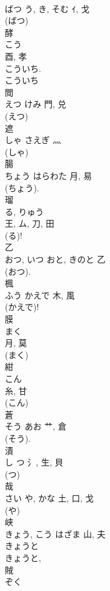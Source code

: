 \documentclass[8pt]{extreport}
\begin{document}
\begin{CJK}{UTF8}{min}
\\	ばつ	う, き, そむ	ｲ, 戈	
\\	(ばつ) 
\\	酵	
\\	こう	
\\	酉, 孝	
\\	こういち.	
\\	こういち
\\	閲	
\\	えつ	けみ	門, 兑	
\\	(えつ) 
\\	遮	
\\	しゃ	さえぎ	灬	
\\	(しゃ) 
\\	腸	
\\	ちょう	はらわた	月, 易	
\\	(ちょう).	
\\	瑠	
\\	る, りゅう	
\\	王, ム, 刀, 田	
\\	(る)!
\\	乙	
\\	おつ, いつ	おと, きのと	乙	
\\	(おつ). 
\\	楓	
\\	ふう	かえで	木, 風	
\\	(かえで)!	
\\	膜	
\\	まく	
\\	月, 莫	
\\	(まく) 
\\	紺	
\\	こん	
\\	糸, 甘	
\\	(こん) 
\\	蒼	
\\	そう	あお	艹, 倉	
\\	(そう). 
\\	漬	
\\	し	つ	氵, 生, 貝	
\\	(つ) 
\\	哉	
\\	さい	や, かな	土, 口, 戈	
\\	(や) 
\\	峡	
\\	きょう, こう	はざま	山, 夫		
\\	きょうと 
\\	きょうと, 
\\	賊	
\\	ぞく	

\end{CJK}
\end{document}
